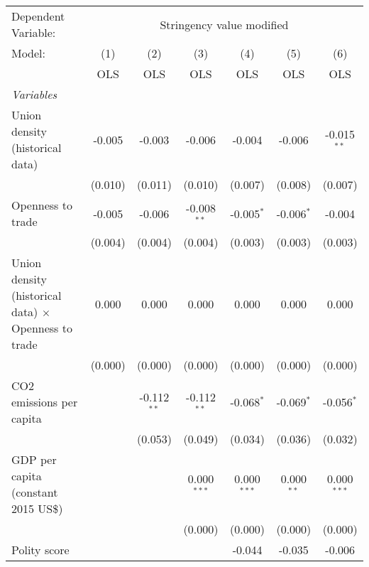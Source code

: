 
\begingroup
\centering
\begin{tabular}{lcccccc}
   \toprule
   Dependent Variable: & \multicolumn{6}{c}{Stringency value modified}\\
   Model:                                                      & (1)     & (2)           & (3)           & (4)           & (5)          & (6)\\  
                                                               &  OLS    & OLS           & OLS           & OLS           & OLS          & OLS\\  
   \midrule
   \emph{Variables}\\
   Union density (historical data)                             & -0.005  & -0.003        & -0.006        & -0.004        & -0.006       & -0.015$^{**}$\\   
                                                               & (0.010) & (0.011)       & (0.010)       & (0.007)       & (0.008)      & (0.007)\\   
   Openness to trade                                           & -0.005  & -0.006        & -0.008$^{**}$ & -0.005$^{*}$  & -0.006$^{*}$ & -0.004\\   
                                                               & (0.004) & (0.004)       & (0.004)       & (0.003)       & (0.003)      & (0.003)\\   
   Union density (historical data) $\times$ Openness to trade  & 0.000   & 0.000         & 0.000         & 0.000         & 0.000        & 0.000\\   
                                                               & (0.000) & (0.000)       & (0.000)       & (0.000)       & (0.000)      & (0.000)\\   
   CO2 emissions per capita                                    &         & -0.112$^{**}$ & -0.112$^{**}$ & -0.068$^{*}$  & -0.069$^{*}$ & -0.056$^{*}$\\   
                                                               &         & (0.053)       & (0.049)       & (0.034)       & (0.036)      & (0.032)\\   
   GDP per capita (constant 2015 US\$)                         &         &               & 0.000$^{***}$ & 0.000$^{***}$ & 0.000$^{**}$ & 0.000$^{***}$\\   
                                                               &         &               & (0.000)       & (0.000)       & (0.000)      & (0.000)\\   
   Polity score                                                &         &               &               & -0.044        & -0.035       & -0.006\\   

\end{tabular}
